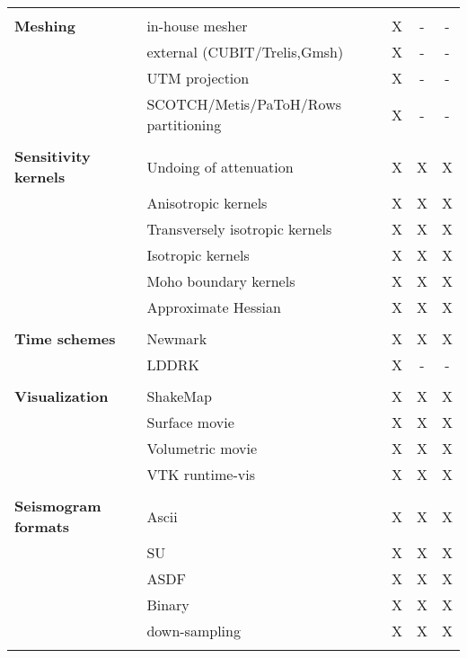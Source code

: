 \begin{table}[htp]
\begin{center}
\begin{tabular}{ l l c c c}
\hline
& & & & \\
{\bf Meshing}           & in-house mesher                       & X  & -  & - \\
                        & external (CUBIT/Trelis,Gmsh)          & X  & -  & - \\
                        & UTM projection                        & X  & -  & - \\
                        & SCOTCH/Metis/PaToH/Rows partitioning  & X  & -  & - \\
\hline
& & & & \\
{\bf Sensitivity kernels} & Undoing of attenuation          & X  & X  & X \\
                          & Anisotropic kernels             & X  & X  & X \\
                          & Transversely isotropic kernels  & X  & X  & X \\
                          & Isotropic kernels               & X  & X  & X \\
                          & Moho boundary kernels           & X  & X  & X \\
                          & Approximate Hessian             & X  & X  & X \\
\hline
& & & & \\
{\bf Time schemes}  & Newmark   & X  & X  & X  \\
                    & LDDRK     & X  & -  & -  \\
\hline
& & & & \\
{\bf Visualization} & ShakeMap          & X  & X  & X \\
                    & Surface movie     & X  & X  & X \\
                    & Volumetric movie  & X  & X  & X \\
                    & VTK runtime-vis   & X  & X  & X \\
\hline
& & & & \\
{\bf Seismogram formats}  & Ascii          & X  & X  & X \\
                          & SU             & X  & X  & X \\
                          & ASDF           & X  & X  & X \\
                          & Binary         & X  & X  & X \\
                          & down-sampling  & X  & X  & X \\
%
\hline
& & & & \\ %
\end{tabular}
\end{center}
\end{table}


